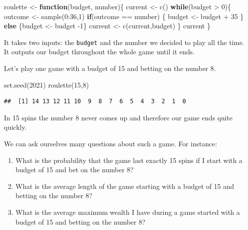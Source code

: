 \documentclass[
]{book}
\newenvironment{Shaded}{\begin{snugshade}}{\end{snugshade}}
\newcommand{\ControlFlowTok}[1]{\textcolor[rgb]{0.13,0.29,0.53}{\textbf{#1}}}
\newcommand{\DecValTok}[1]{\textcolor[rgb]{0.00,0.00,0.81}{#1}}
\newcommand{\FunctionTok}[1]{\textcolor[rgb]{0.00,0.00,0.00}{#1}}
\newcommand{\NormalTok}[1]{#1}
\newcommand{\OtherTok}[1]{\textcolor[rgb]{0.56,0.35,0.01}{#1}}
\newcommand{\SpecialCharTok}[1]{\textcolor[rgb]{0.00,0.00,0.00}{#1}}
\begin{document}
\begin{Shaded}
\begin{Highlighting}[]
\NormalTok{roulette }\OtherTok{\textless{}{-}} \ControlFlowTok{function}\NormalTok{(budget, number)\{}
\NormalTok{  current }\OtherTok{\textless{}{-}} \FunctionTok{c}\NormalTok{()}
  \ControlFlowTok{while}\NormalTok{(budget }\SpecialCharTok{\textgreater{}} \DecValTok{0}\NormalTok{)\{}
\NormalTok{    outcome }\OtherTok{\textless{}{-}} \FunctionTok{sample}\NormalTok{(}\DecValTok{0}\SpecialCharTok{:}\DecValTok{36}\NormalTok{,}\DecValTok{1}\NormalTok{)}
    \ControlFlowTok{if}\NormalTok{(outcome }\SpecialCharTok{==}\NormalTok{ number) \{}
\NormalTok{      budget }\OtherTok{\textless{}{-}}\NormalTok{ budget }\SpecialCharTok{+} \DecValTok{35}
\NormalTok{    \}}
    \ControlFlowTok{else}\NormalTok{ \{budget }\OtherTok{\textless{}{-}}\NormalTok{ budget }\SpecialCharTok{{-}}\DecValTok{1}\NormalTok{\}}
\NormalTok{    current }\OtherTok{\textless{}{-}} \FunctionTok{c}\NormalTok{(current,budget)}
\NormalTok{  \}}
\NormalTok{  current}
\NormalTok{\}}
\end{Highlighting}
\end{Shaded}

It takes two inputs: the \texttt{budget} and the number we decided to play all the time. It outputs our budget throughout the whole game until it ends.

Let's play one game with a budget of 15 and betting on the number 8.

\begin{Shaded}
\begin{Highlighting}[]
\FunctionTok{set.seed}\NormalTok{(}\DecValTok{2021}\NormalTok{)}
\FunctionTok{roulette}\NormalTok{(}\DecValTok{15}\NormalTok{,}\DecValTok{8}\NormalTok{)}
\end{Highlighting}
\end{Shaded}

\begin{verbatim}
##  [1] 14 13 12 11 10  9  8  7  6  5  4  3  2  1  0
\end{verbatim}

In 15 spins the number 8 never comes up and therefore our game ends quite quickly.

We can ask ourselves many questions about such a game. For instance:

\begin{enumerate}
\def\labelenumi{\arabic{enumi}.}
\item
  What is the probability that the game last exactly 15 spins if I start with a budget of 15 and bet on the number 8?
\item
  What is the average length of the game starting with a budget of 15 and betting on the number 8?
\item
  What is the average maximum wealth I have during a game started with a budget of 15 and betting on the number 8?
\end{enumerate}
\end{document}
